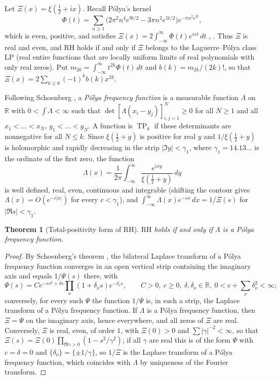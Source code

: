 \documentclass[11pt]{amsart}
\newtheorem{theorem}{Theorem}[section]
\theoremstyle{definition}
\theoremstyle{remark}
\DeclareMathOperator{\TP}{TP}
\newcommand{\bbR}{\mathbb{R}}
\newcommand{\Xib}{\Xi}
\newcommand{\LP}{\mathrm{LP}}
\newcommand{\RH}{\mathrm{RH}}
\begin{document}
Let $\Xib(x)=\xi(\tfrac12+ix)$. Recall P\'olya's kernel
\[
\Phi(t)=\sum_{n\ge1}\bigl(2\pi^2 n^4 e^{9t/2}-3\pi n^2 e^{5t/2}\bigr)
e^{-\pi n^2 e^{2t}},
\]
which is even, positive, and satisfies
$\Xib(x)=2\int_{-\infty}^{\infty}\Phi(t)e^{ixt}\,dt$
\cite[\S10.1]{bgTitchmarsh}, \cite{CNV86}. Thus $\Xib$ is real and even, and RH
holds if and only if $\Xib$ belongs to the Laguerre--P\'olya class $\LP$ (real
entire functions that are locally uniform limits of real polynomials with only
real zeros). Put $m_{2k}=\int_{-\infty}^{\infty}t^{2k}\Phi(t)\,dt$ and
$b(k)=m_{2k}/(2k)!$, so that $\Xib(x)=2\sum_{k\ge0}(-1)^k b(k)x^{2k}$.

Following Schoenberg \cite{Schoenberg51}, a \emph{P\'olya frequency function}
is a measurable function $\Lambda$ on $\bbR$ with $0<\int\Lambda<\infty$ such
that $\det[\Lambda(x_i-y_j)]_{i,j=1}^N\ge0$ for all $N\ge1$ and all
$x_1<\dots<x_N$, $y_1<\dots<y_N$. A function is $\TP_k$ if these
determinants are nonnegative for all $N\le k$. Since $\xi(\tfrac12+y)$ is
positive for real $y$ and $1/\xi(\tfrac12+y)$ is holomorphic and rapidly
decreasing in the strip $|\Im y|<\gamma_1$, where $\gamma_1=14.13\ldots$ is
the ordinate of the first zero, the function
\[
\Lambda(x)=\frac1{2\pi}\int_{-\infty}^{\infty}\frac{e^{ixy}}{\xi(\tfrac12+y)}\,dy
\]
is well defined, real, even, continuous and integrable (shifting the contour
gives $\Lambda(x)=O(e^{-c|x|})$ for every $c<\gamma_1$), and
$\int_{-\infty}^{\infty}\Lambda(x)e^{-sx}\,dx=1/\Xib(s)$ for
$|\Re s|<\gamma_1$.

\begin{theorem}[Total-positivity form of RH]\label{thm:tp}
$\RH$ holds if and only if $\Lambda$ is a P\'olya frequency function.
\end{theorem}
\begin{proof}
By Schoenberg's theorem \cite{Schoenberg51}, the bilateral Laplace transform
of a P\'olya frequency function converges in an open vertical strip containing
the imaginary axis and equals $1/\Psi(s)$ there, with
\[
\Psi(s)=Ce^{-cs^2+\delta s}\prod_\nu(1+\delta_\nu s)e^{-\delta_\nu s},\qquad
C>0,\ c\ge0,\ \delta,\delta_\nu\in\bbR,\ 0<c+\sum_\nu\delta_\nu^2<\infty ;
\]
conversely, for every such $\Psi$ the function $1/\Psi$ is, in such a strip,
the Laplace transform of a P\'olya frequency function. If $\Lambda$ is a
P\'olya frequency function, then $\Xib=\Psi$ on the imaginary axis, hence
everywhere, and all zeros of $\Xib$ are real. Conversely, $\Xib$ is real,
even, of order $1$, with $\Xib(0)>0$ and $\sum|\gamma|^{-2}<\infty$, so that
$\Xib(s)=\Xib(0)\prod_{\Re\gamma>0}(1-s^2/\gamma^2)$; if all $\gamma$ are real
this is of the form $\Psi$ with $c=\delta=0$ and
$\{\delta_\nu\}=\{\pm1/\gamma\}$, so $1/\Xib$ is the Laplace transform of a
P\'olya frequency function, which coincides with $\Lambda$ by uniqueness of
the Fourier transform.
\end{proof}
\end{document}
